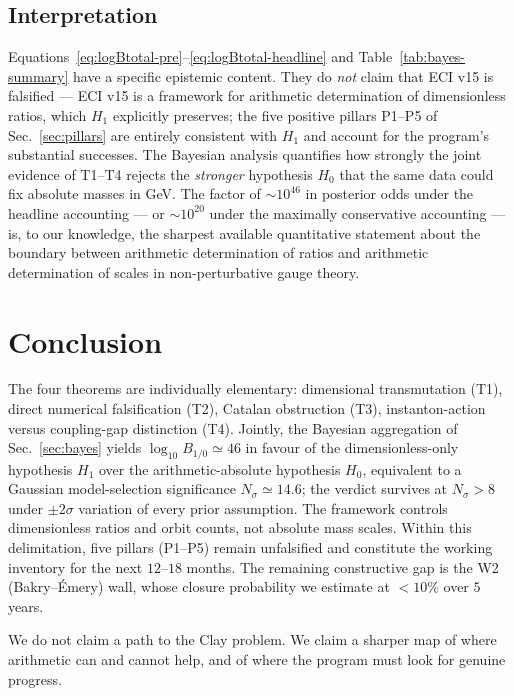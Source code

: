 \documentclass[aps,prl,reprint,superscriptaddress,floatfix,nofootinbib,amssymb]{revtex4-2}
\theoremstyle{definition}
\theoremstyle{remark}
\begin{document}
\subsection{Interpretation}\label{sec:bayes:interp}

Equations~\eqref{eq:logBtotal-pre}--\eqref{eq:logBtotal-headline} and
Table~\ref{tab:bayes-summary} have a specific epistemic content. They
do \emph{not} claim that ECI v15 is falsified --- ECI v15 is a
framework for arithmetic determination of dimensionless ratios, which
$H_1$ explicitly preserves; the five positive pillars P1--P5 of
Sec.~\ref{sec:pillars} are entirely consistent with $H_1$ and account
for the program's substantial successes. The Bayesian analysis
quantifies how strongly the joint evidence of T1--T4 rejects the
\emph{stronger} hypothesis $H_0$ that the same data could fix
absolute masses in GeV. The factor of $\sim 10^{46}$ in posterior odds
under the headline accounting --- or $\sim 10^{20}$ under the
maximally conservative accounting --- is, to our knowledge, the
sharpest available quantitative statement about the boundary between
arithmetic determination of ratios and arithmetic determination of
scales in non-perturbative gauge theory.

\section{Conclusion}\label{sec:conclusion}

The four theorems are individually elementary: dimensional
transmutation (T1), direct numerical falsification (T2), Catalan
obstruction (T3), instanton-action versus coupling-gap distinction
(T4). Jointly, the Bayesian aggregation of
Sec.~\ref{sec:bayes} yields
$\log_{10} B_{1/0} \simeq 46$ in favour of the dimensionless-only
hypothesis $H_1$ over the arithmetic-absolute hypothesis $H_0$,
equivalent to a Gaussian model-selection significance
$N_\sigma \simeq 14.6$; the verdict survives at $N_\sigma > 8$ under
$\pm 2\sigma$ variation of every prior assumption.
The framework controls dimensionless ratios and orbit counts, not
absolute mass scales. Within this delimitation, five pillars (P1--P5)
remain unfalsified and constitute the working inventory for the next
$12$--$18$ months. The remaining constructive gap is the W2
(Bakry--\'Emery) wall, whose closure probability we estimate at
$<10\%$ over $5$ years.

We do not claim a path to the Clay problem. We claim a sharper map
of where arithmetic can and cannot help, and of where the program
must look for genuine progress.
\end{document}
